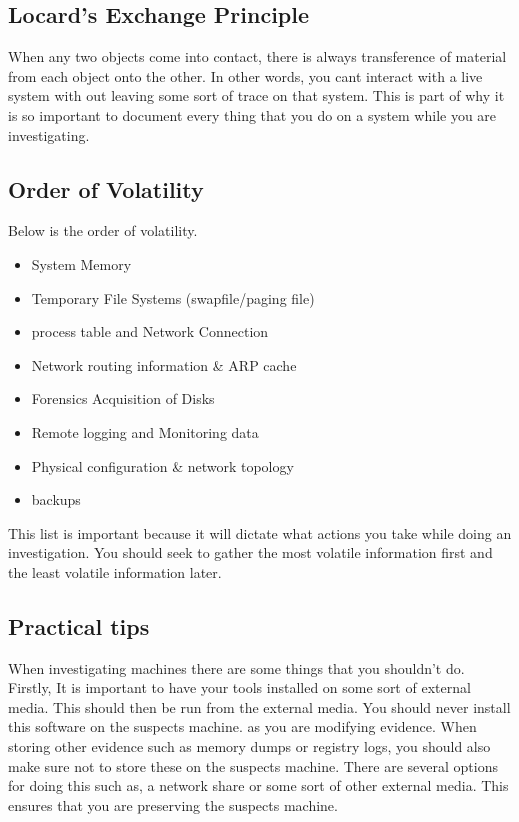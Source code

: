 \documentclass[letterpaper, onecolumn,10pt]{IEEEtran}
\begin{document}
            \subsection{Locard's Exchange Principle} When any two objects come into contact, there is always transference of material from each object onto the other. In other words, you cant interact with a live system with out leaving some sort of trace on that system. This is part of why it is so important to document every thing that you do on a system while you are investigating.
            
            \subsection{Order of Volatility} Below is the order of volatility.
            \begin{itemize}
                \item System Memory
                \item Temporary File Systems (swapfile/paging file)
                \item process table and Network Connection
                \item Network routing information & ARP cache
                \item Forensics Acquisition of Disks
                \item Remote logging and Monitoring data
                \item Physical configuration & network topology
                \item backups
            \end{itemize}
            This list is important because it will dictate what actions you take while doing an investigation. You should seek to gather the most volatile information first and the least volatile information later.\\
            
            \subsection{Practical tips} When investigating machines there are some things that you shouldn't do. Firstly, It is important to have your tools installed on some sort of external media. This should then be run from the external media. You should never install this software on the suspects machine. as you are modifying evidence. When storing other evidence such as memory dumps or registry logs, you should also make sure not to store these on the suspects machine. There are several options for doing this such as, a network share or some sort of other external media. This ensures that you are preserving the suspects machine.\\
            
\end{document}
